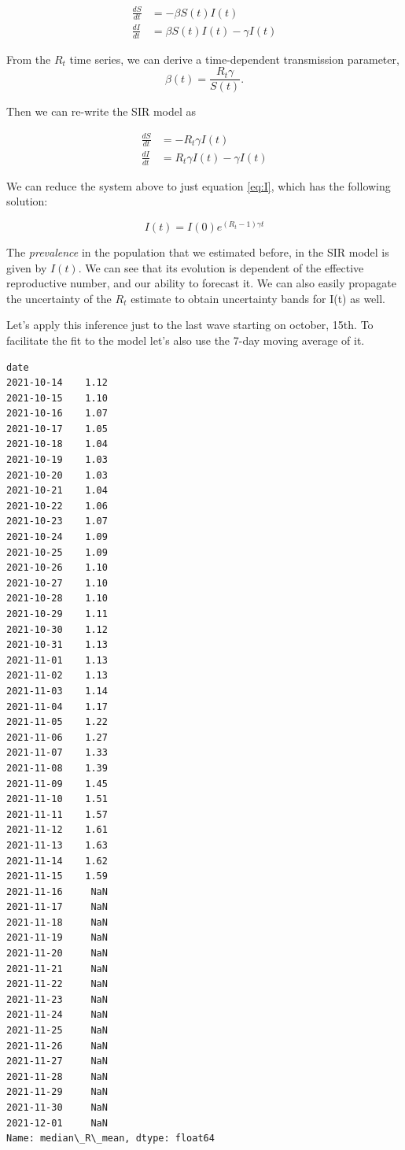 \documentclass[11pt]{article}
\begin{document}
\begin{align}
\frac{dS}{dt} &= -\beta S(t)I(t)\\
\frac{dI}{dt} &= \beta S(t)I(t) -\gamma I(t)
\end{align}

From the \(R_t\) time series, we can derive a time-dependent
transmission parameter, \[\beta(t)=\frac{R_t \gamma}{S(t)}.\]

Then we can re-write the SIR model as

\begin{align}
\frac{dS}{dt} &= -R_t\gamma I(t)\\
\frac{dI}{dt} &= R_t\gamma I(t) -\gamma I(t) \label{eq:I}
\end{align}

We can reduce the system above to just equation \ref{eq:I}, which has
the following solution:

\[I(t) = I(0) e^{(R_t-1)\gamma t}\]

The \emph{prevalence} in the population that we estimated before, in the
SIR model is given by \(I(t)\). We can see that its evolution is
dependent of the effective reproductive number, and our ability to
forecast it. We can also easily propagate the uncertainty of the \(R_t\)
estimate to obtain uncertainty bands for I(t) as well.

    Let's apply this inference just to the last wave starting on october,
15th. To facilitate the fit to the model let's also use the 7-day moving
average of it.

    
    
            \begin{tcolorbox}[breakable, size=fbox, boxrule=.5pt, pad at break*=1mm, opacityfill=0]
\begin{Verbatim}[commandchars=\\\{\}]
date
2021-10-14    1.12
2021-10-15    1.10
2021-10-16    1.07
2021-10-17    1.05
2021-10-18    1.04
2021-10-19    1.03
2021-10-20    1.03
2021-10-21    1.04
2021-10-22    1.06
2021-10-23    1.07
2021-10-24    1.09
2021-10-25    1.09
2021-10-26    1.10
2021-10-27    1.10
2021-10-28    1.10
2021-10-29    1.11
2021-10-30    1.12
2021-10-31    1.13
2021-11-01    1.13
2021-11-02    1.13
2021-11-03    1.14
2021-11-04    1.17
2021-11-05    1.22
2021-11-06    1.27
2021-11-07    1.33
2021-11-08    1.39
2021-11-09    1.45
2021-11-10    1.51
2021-11-11    1.57
2021-11-12    1.61
2021-11-13    1.63
2021-11-14    1.62
2021-11-15    1.59
2021-11-16     NaN
2021-11-17     NaN
2021-11-18     NaN
2021-11-19     NaN
2021-11-20     NaN
2021-11-21     NaN
2021-11-22     NaN
2021-11-23     NaN
2021-11-24     NaN
2021-11-25     NaN
2021-11-26     NaN
2021-11-27     NaN
2021-11-28     NaN
2021-11-29     NaN
2021-11-30     NaN
2021-12-01     NaN
Name: median\_R\_mean, dtype: float64
\end{Verbatim}
\end{tcolorbox}
        
\end{document}
